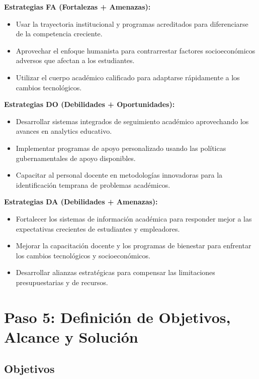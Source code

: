 \documentclass[12pt,letterpaper]{report}
\begin{document}
\textbf{Estrategias FA (Fortalezas + Amenazas):}
\begin{itemize}
    \item Usar la trayectoria institucional y programas acreditados para diferenciarse de la competencia creciente.
    \item Aprovechar el enfoque humanista para contrarrestar factores socioeconómicos adversos que afectan a los estudiantes.
    \item Utilizar el cuerpo académico calificado para adaptarse rápidamente a los cambios tecnológicos.
\end{itemize}

\textbf{Estrategias DO (Debilidades + Oportunidades):}
\begin{itemize}
    \item Desarrollar sistemas integrados de seguimiento académico aprovechando los avances en analytics educativo.
    \item Implementar programas de apoyo personalizado usando las políticas gubernamentales de apoyo disponibles.
    \item Capacitar al personal docente en metodologías innovadoras para la identificación temprana de problemas académicos.
\end{itemize}

\textbf{Estrategias DA (Debilidades + Amenazas):}
\begin{itemize}
    \item Fortalecer los sistemas de información académica para responder mejor a las expectativas crecientes de estudiantes y empleadores.
    \item Mejorar la capacitación docente y los programas de bienestar para enfrentar los cambios tecnológicos y socioeconómicos.
    \item Desarrollar alianzas estratégicas para compensar las limitaciones presupuestarias y de recursos.
\end{itemize}
\section{Paso 5: Definición de Objetivos, Alcance y Solución}

\subsection{Objetivos}
\end{document}
